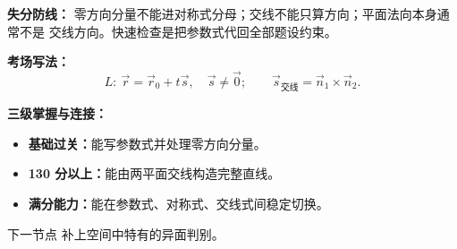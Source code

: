 \begin{knowledgeBox}
\textbf{失分防线：}
零方向分量不能进对称式分母；交线不能只算方向；平面法向本身通常不是
交线方向。快速检查是把参数式代回全部题设约束。

\textbf{考场写法：}
\[
\boxed{L:\ \vec r=\vec r_0+t\vec s,\quad \vec s\ne\vec0;\qquad
\vec s_{\text{交线}}=\vec n_1\times\vec n_2.}
\]

\textbf{三级掌握与连接：}
\begin{itemize}
  \item \textbf{基础过关：}能写参数式并处理零方向分量。
  \item \textbf{130 分以上：}能由两平面交线构造完整直线。
  \item \textbf{满分能力：}能在参数式、对称式、交线式间稳定切换。
\end{itemize}
下一节点 
补上空间中特有的异面判别。
\end{knowledgeBox}



